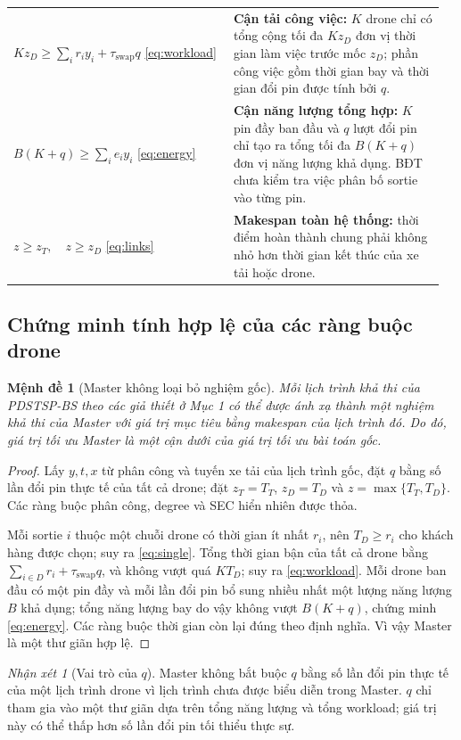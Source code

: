 \documentclass[11pt,a4paper]{article}
\theoremstyle{definition}
\theoremstyle{plain}
\newtheorem{proposition}{Mệnh đề}[section]
\theoremstyle{remark}
\newtheorem{remark}{Nhận xét}[section]
\newcommand{\sw}{\tau_{\mathrm{swap}}}
\begin{document}
\begin{longtable}{@{}p{0.49\linewidth}p{0.47\linewidth}@{}}
$\displaystyle Kz_D\ge\sum_i r_i y_i+\sw q$ \eqref{eq:workload}
& \textbf{Cận tải công việc:} $K$ drone chỉ có tổng cộng tối đa $Kz_D$ đơn vị thời gian làm việc trước mốc $z_D$; phần công việc gồm thời gian bay và thời gian đổi pin được tính bởi $q$.\\
$\displaystyle B(K+q)\ge\sum_i e_i y_i$ \eqref{eq:energy}
& \textbf{Cận năng lượng tổng hợp:} $K$ pin đầy ban đầu và $q$ lượt đổi pin chỉ tạo ra tổng tối đa $B(K+q)$ đơn vị năng lượng khả dụng. BĐT chưa kiểm tra việc phân bố sortie vào từng pin.\\
$z\ge z_T,\quad z\ge z_D$ \eqref{eq:links}
& \textbf{Makespan toàn hệ thống:} thời điểm hoàn thành chung phải không nhỏ hơn thời gian kết thúc của xe tải hoặc drone.\\
\end{longtable}
\endgroup

\subsection{Chứng minh tính hợp lệ của các ràng buộc drone}
\begin{proposition}[Master không loại bỏ nghiệm gốc]\label{prop:mastervalid}
Mỗi lịch trình khả thi của PDSTSP-BS theo các giả thiết ở Mục 1 có thể được ánh xạ thành một nghiệm khả thi của Master với giá trị mục tiêu bằng makespan của lịch trình đó. Do đó, giá trị tối ưu Master là một cận dưới của giá trị tối ưu bài toán gốc.
\end{proposition}
\begin{proof}
Lấy $y,t,x$ từ phân công và tuyến xe tải của lịch trình gốc, đặt $q$ bằng số lần đổi pin thực tế của tất cả drone; đặt $z_T=T_T$, $z_D=T_D$ và $z=\max\{T_T,T_D\}$. Các ràng buộc phân công, degree và SEC hiển nhiên được thỏa.

Mỗi sortie $i$ thuộc một chuỗi drone có thời gian ít nhất $r_i$, nên $T_D\ge r_i$ cho khách hàng được chọn; suy ra \eqref{eq:single}. Tổng thời gian bận của tất cả drone bằng $\sum_{i\in D}r_i+\sw q$, và không vượt quá $KT_D$; suy ra \eqref{eq:workload}. Mỗi drone ban đầu có một pin đầy và mỗi lần đổi pin bổ sung nhiều nhất một lượng năng lượng $B$ khả dụng; tổng năng lượng bay do vậy không vượt $B(K+q)$, chứng minh \eqref{eq:energy}. Các ràng buộc thời gian còn lại đúng theo định nghĩa. Vì vậy Master là một thư giãn hợp lệ.
\end{proof}
\begin{remark}[Vai trò của $q$]
Master không bắt buộc $q$ bằng số lần đổi pin thực tế của một lịch trình drone vì lịch trình chưa được biểu diễn trong Master. $q$ chỉ tham gia vào một thư giãn dựa trên tổng năng lượng và tổng workload; giá trị này có thể thấp hơn số lần đổi pin tối thiểu thực sự.
\end{remark}
\end{document}
